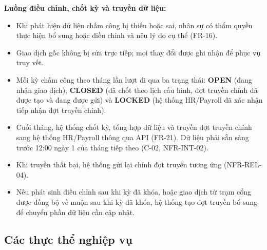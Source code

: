 \textbf{Luồng điều chỉnh, chốt kỳ và truyền dữ liệu:}
\begin{itemize}
    \item Khi phát hiện dữ liệu chấm công bị thiếu hoặc sai, nhân sự có thẩm quyền thực hiện bổ sung hoặc điều chỉnh và nêu lý do cụ thể (FR-16).
    \item Giao dịch gốc không bị sửa trực tiếp; mọi thay đổi được ghi nhận để phục vụ truy vết.
    \item Mỗi kỳ chấm công theo tháng lần lượt đi qua ba trạng thái: \textbf{OPEN} (đang nhận giao dịch), \textbf{CLOSED} (đã chốt theo lịch cấu hình, đợt truyền chính đã được tạo và đang được gửi) và \textbf{LOCKED} (hệ thống HR/Payroll đã xác nhận tiếp nhận đợt truyền chính).
    \item Cuối tháng, hệ thống chốt kỳ, tổng hợp dữ liệu và truyền đợt truyền chính sang hệ thống HR/Payroll thông qua API (FR-21). Dữ liệu phải sẵn sàng trước 12:00 ngày 1 của tháng tiếp theo (C-02, NFR-INT-02).
    \item Khi truyền thất bại, hệ thống gửi lại chính đợt truyền tương ứng (NFR-REL-04).
    \item Nếu phát sinh điều chỉnh sau khi kỳ đã khóa, hoặc giao dịch từ trạm cổng được đồng bộ về muộn sau khi kỳ đã khóa, hệ thống tạo đợt truyền bổ sung để chuyển phần dữ liệu cần cập nhật.
\end{itemize}

\subsection{Các thực thể nghiệp vụ}\label{sec:business-entities}

